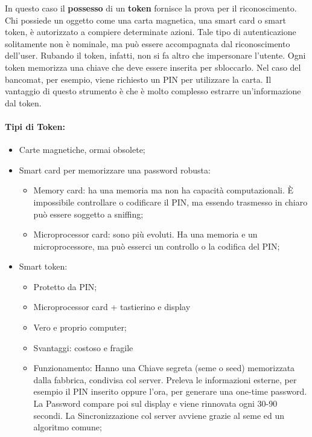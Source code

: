 In questo caso il \textbf{possesso} di un \textbf{token} fornisce la prova per
il riconoscimento.
Chi possiede un oggetto come una carta magnetica, una smart card o smart token,
è autorizzato a compiere determinate azioni. Tale tipo di autenticazione
solitamente non è nominale, ma può essere accompagnata dal riconoscimento
dell'user. Rubando il token, infatti, non si fa altro che impersonare l'utente.
Ogni token memorizza una chiave che deve essere inserita per sbloccarlo.
Nel caso del bancomat, per esempio, viene richiesto un PIN per utilizzare la carta.
Il vantaggio di questo strumento è che è molto complesso estrarre
un'informazione dal token.

\paragraph{Tipi di Token: }

\begin{itemize}
      \item Carte magnetiche, ormai obsolete;
      \item Smart card per memorizzare una password robusta:
            \begin{itemize}
                  \item Memory card: ha una memoria ma non ha capacità computazionali.
                        È impossibile
                        controllare o codificare il PIN, ma essendo trasmesso in chiaro può
                        essere soggetto
                        a sniffing;
                  \item Microprocessor card: sono più evoluti. Ha una memoria e
                        un microprocessore, ma
                        può esserci un controllo o la codifica del PIN;
            \end{itemize}
      \item Smart token:
            \begin{itemize}
                  \item Protetto da PIN;
                  \item  Microprocessor card + tastierino e display
                  \item  Vero e proprio computer;
                  \item  Svantaggi: costoso e fragile
                  \item  Funzionamento: Hanno una Chiave segreta (seme o seed)
                        memorizzata dalla fabbrica,
                        condivisa col server. Preleva le informazioni esterne,
                        per esempio il PIN inserito oppure
                        l'ora, per generare una one-time password.
                        La Password compare poi sul display e viene
                        rinnovata ogni 30-90 secondi.
                        La Sincronizzazione col server avviene grazie al seme ed un
                        algoritmo comune;
            \end{itemize}
\end{itemize}

